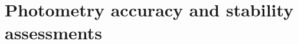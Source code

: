 \documentclass[a4paper, 11pt]{report}
\begin{document}



  

\label{se:aperture_photo_calibration}

\clearpage
\chapter{Photometry accuracy and stability assessments}%
\label{se:photometry}





%


%


%


\clearpage
%


\clearpage
\end{document}
